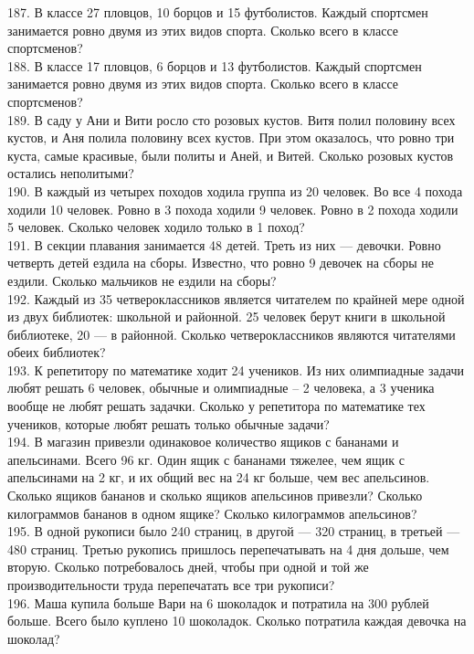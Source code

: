 187. В классе 27 пловцов, 10 борцов и 15 футболистов. Каждый спортсмен занимается ровно двумя из этих видов спорта. Сколько всего в классе спортсменов?\\
188. В классе 17 пловцов, 6 борцов и 13 футболистов. Каждый спортсмен занимается ровно двумя из этих видов спорта. Сколько всего в классе спортсменов?\\
189. В саду у Ани и Вити росло сто розовых кустов. Витя полил половину всех кустов, и Аня полила половину всех кустов. При этом оказалось, что ровно три куста, самые красивые, были политы и Аней, и Витей. Сколько розовых кустов остались неполитыми?\\
190. В каждый из четырех походов ходила группа из 20 человек. Во все 4 похода ходили 10 человек. Ровно в 3 похода ходили 9 человек. Ровно в 2 похода ходили 5 человек. Сколько человек ходило только в 1 поход?\\
191. В секции плавания занимается 48 детей. Треть из них --- девочки. Ровно четверть детей ездила на сборы. Известно, что ровно 9 девочек на сборы не ездили. Сколько мальчиков не ездили на сборы?\\
192. Каждый из 35 четвероклассников является читателем по крайней мере одной из двух библиотек: школьной и районной. 25 человек берут книги в школьной библиотеке, 20 --- в районной. Сколько четвероклассников являются читателями обеих библиотек?\\
193.  К репетитору по математике ходит 24 учеников. Из них олимпиадные задачи любят решать 6 человек, обычные и олимпиадные – 2 человека, а 3 ученика вообще не любят решать задачки. Сколько у репетитора по математике тех учеников, которые любят решать только обычные задачи?\\
194. В магазин привезли одинаковое количество ящиков с бананами и апельсинами. Всего 96 кг.  Один ящик с бананами тяжелее, чем ящик с апельсинами на 2 кг, и их общий вес на 24 кг больше, чем вес апельсинов. Сколько ящиков бананов и сколько  ящиков апельсинов привезли? Сколько килограммов бананов в одном ящике? Сколько килограммов апельсинов?\\
195. В одной рукописи было 240 страниц, в другой --- 320 страниц, в третьей --- 480 страниц. Третью рукопись пришлось перепечатывать на 4 дня дольше, чем вторую. Сколько потребовалось дней, чтобы при одной и той же производительности труда перепечатать все три рукописи?\\
196. Маша купила больше Вари на 6 шоколадок и потратила на 300 рублей больше. Всего было куплено 10 шоколадок. Сколько потратила каждая девочка на шоколад?\\
